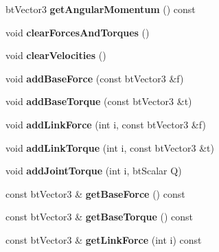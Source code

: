 \begin{DoxyCompactItemize}
\mbox{\label{classbtMultiBody_acff3d6a623c306ce91cdd007fff0ed23}} 
bt\+Vector3 {\bfseries get\+Angular\+Momentum} () const
\item 
\mbox{\label{classbtMultiBody_aff9f8aa773319219146b7f1aa5849e8e}} 
void {\bfseries clear\+Forces\+And\+Torques} ()
\item 
\mbox{\label{classbtMultiBody_a504c9eb4bba7d799b76b3a5c2e59a2c1}} 
void {\bfseries clear\+Velocities} ()
\item 
\mbox{\label{classbtMultiBody_af485aabee052a04aafab737ed6d45c09}} 
void {\bfseries add\+Base\+Force} (const bt\+Vector3 \&f)
\item 
\mbox{\label{classbtMultiBody_a57545c47299f1a3ec305461e6ec6b5c4}} 
void {\bfseries add\+Base\+Torque} (const bt\+Vector3 \&t)
\item 
\mbox{\label{classbtMultiBody_a7c3897d0dc78fae74b1f665349596713}} 
void {\bfseries add\+Link\+Force} (int i, const bt\+Vector3 \&f)
\item 
\mbox{\label{classbtMultiBody_a6fca672a0de1e44a828e2ed2b2bfca3b}} 
void {\bfseries add\+Link\+Torque} (int i, const bt\+Vector3 \&t)
\item 
\mbox{\label{classbtMultiBody_a7c55a0935f2bcc58863c9d6724f3976a}} 
void {\bfseries add\+Joint\+Torque} (int i, bt\+Scalar Q)
\item 
\mbox{\label{classbtMultiBody_a9f18e807db3bd459bbbb5cf120302653}} 
const bt\+Vector3 \& {\bfseries get\+Base\+Force} () const
\item 
\mbox{\label{classbtMultiBody_accd9836cb0693648aedb407dc4c824ff}} 
const bt\+Vector3 \& {\bfseries get\+Base\+Torque} () const
\item 
\mbox{\label{classbtMultiBody_a8695151e15f6d44326c794a6d9094d76}} 
const bt\+Vector3 \& {\bfseries get\+Link\+Force} (int i) const
\item 
\mbox{\label{classbtMultiBody_a135102c597640149746f8b0fafac34ad}} 

\end{DoxyCompactItemize}
